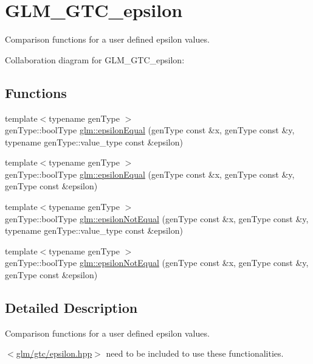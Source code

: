 \hypertarget{group__gtc__epsilon}{}\section{G\+L\+M\+\_\+\+G\+T\+C\+\_\+epsilon}
\label{group__gtc__epsilon}


Comparison functions for a user defined epsilon values.  


Collaboration diagram for G\+L\+M\+\_\+\+G\+T\+C\+\_\+epsilon\+:
\subsection*{Functions}
\begin{DoxyCompactItemize}
\item 
{\footnotesize template$<$typename gen\+Type $>$ }\\gen\+Type\+::bool\+Type \hyperlink{group__gtc__epsilon_gaad4e444823c0751ab1a90993d37be4c2}{glm\+::epsilon\+Equal} (gen\+Type const \&x, gen\+Type const \&y, typename gen\+Type\+::value\+\_\+type const \&epsilon)
\item 
{\footnotesize template$<$typename gen\+Type $>$ }\\gen\+Type\+::bool\+Type \hyperlink{group__gtc__epsilon_gaec6b443164caf0c13f8539d135619b6d}{glm\+::epsilon\+Equal} (gen\+Type const \&x, gen\+Type const \&y, gen\+Type const \&epsilon)
\item 
{\footnotesize template$<$typename gen\+Type $>$ }\\gen\+Type\+::bool\+Type \hyperlink{group__gtc__epsilon_ga71753a95d99c01418eb74ef87638aa2f}{glm\+::epsilon\+Not\+Equal} (gen\+Type const \&x, gen\+Type const \&y, typename gen\+Type\+::value\+\_\+type const \&epsilon)
\item 
{\footnotesize template$<$typename gen\+Type $>$ }\\gen\+Type\+::bool\+Type \hyperlink{group__gtc__epsilon_gab5f646ca785d3d521d68115468be754b}{glm\+::epsilon\+Not\+Equal} (gen\+Type const \&x, gen\+Type const \&y, gen\+Type const \&epsilon)
\end{DoxyCompactItemize}


\subsection{Detailed Description}
Comparison functions for a user defined epsilon values. 

$<$\hyperlink{gtc_2epsilon_8hpp}{glm/gtc/epsilon.\+hpp}$>$ need to be included to use these functionalities. 

